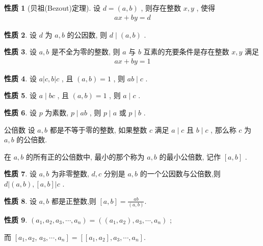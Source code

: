 \documentclass[aspectratio=169]{ctexbeamer}
\theoremstyle{definition}
\newtheorem{property}{性质}[section]
\begin{document}
\begin{frame}
	\begin{property}[贝祖(Bezout)定理]
		设 $d=(a, b)$ , 则存在整数 $x ,  y$ , 使得
		\begin{align*}
			a x+b y=d
		\end{align*}
	\end{property}
	\begin{property}\label{prop:如果d是a,b公因数则d|(a,b)}
		设 $d$ 为 $a ,  b$ 的公因数, 则 $d \mid(a, b)$ .
	\end{property}\begin{property}\label{prop:a,b互素的充要条件}
		设 $a ,  b$ 是不全为零的整数, 则 $a$ 与 $b$ 互素的充要条件是存在整数 $x ,  y$ 满足
		\begin{align*}
			a x+b y=1
		\end{align*}
	\end{property}
\end{frame}

\begin{frame}
	\begin{property}
		设 $a|c, b| c$ , 且 $(a, b)=1$ , 则 $a b \mid c$ .
	\end{property}
	\begin{property}
		设 $a \mid b c$ , 且 $(a, b)=1$ , 则 $a \mid c$ .
	\end{property}
	\begin{property}\label{prop:如果p是ab的公因数则p是a或b的公因数}
		设 $p$ 为素数,  $p \mid a b$ , 则 $p \mid a$ 或 $p \mid b$ .
	\end{property}
\end{frame}

\begin{frame}{公倍数}
	设 $a ,  b$ 都是不等于零的整数, 如果整数 $c$ 满足 $a \mid c$ 且 $b \mid c$ , 那么称 $c$ 为 $a ,  b$ 的公倍数.

	在 $a ,  b$ 的所有正的公倍数中, 最小的那个称为 $a ,  b$ 的最小公倍数, 记作 $[a, b]$ .
\end{frame}

\begin{frame}
	\begin{property}
		设 $a ,  b$ 为非零整数, $d ,  c$ 分别是 $a ,  b$ 的一个公因数与公倍数,则 $d|(a, b),[a, b]| c$ .
	\end{property}
	\begin{property}\label{prop:最大公因数与最小公倍数的关系}
		设 $a ,  b$ 都是正整数,则 $[a, b]=\frac{a b}{(a, b)}$.
	\end{property}
	\begin{property}
		$\left(a_{1}, a_{2}, a_{3}, \cdots, a_{n}\right)=\left(\left(a_{1}, a_{2}\right), a_{3}, \cdots, a_{n}\right)$ ;

		而 $\left[a_{1}, a_{2}\right.$, $\left.a_{3}, \cdots, a_{n}\right]=\left[\left[a_{1}, a_{2}\right], a_{3}, \cdots, a_{n}\right]$.
	\end{property}
\end{frame}
\end{document}
